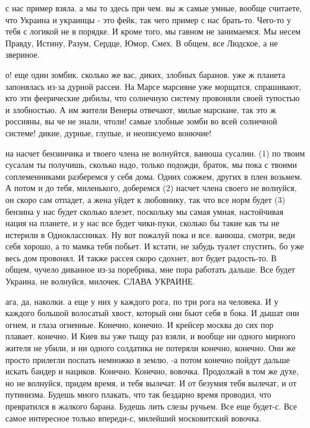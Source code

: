 с нас пример взяла. а мы то здесь при чем. вы ж самые умные, вообще считаете,
что Украина и украинцы - это фейк, так чего пример с нас брать-то. Чего-то у
тебя с логикой не в порядке. И кроме того, мы гавном не занимаемся. Мы несем
Правду, Истину, Разум, Сердце, Юмор, Смех. В общем, все Людское, а не звериное.

о! еще один зомбик. сколько же вас, диких, злобных баранов. уже ж планета
запонялась из-за дурной рассеи. На Марсе марсияне уже морщатся, спрашивают, кто
эти феерические дибилы, что солнечную систему провоняли своей тупостью и
злобностью. А им жители Венеры отвечают, милые марсиане, так это ж россияны, вы
че не знали, чтоли! самые злобные зомби во всей солнечной системе! дикие,
дурные, глупые, и неописуемо вонючие!

на насчет бензинчика и твоего члена не волнуйтся, ванюша сусалин. (1) по твоим
сусалам ты получишь, сколько надо, только подожди, браток, мы пока с твоими
соплеменниками разберемся у себя дома. Одних сожжем, других в плен возьмем. А
потом и до тебя, миленького, доберемся (2) насчет члена своего не волнуйся, он
скоро сам отпадет, а жена уйдет к любовнику, так что все норм будет (3) бензина
у нас будет сколько влезет, поскольку мы самая умная, настойчивая нация на
планете, и у нас все будет чики-пуки, сколько бы такие как ты не истерили в
Одноклассниках. Ну вот пожалуй пока и все. ванюша, смотри, веди себя хорошо, а
то мамка тебя побьет. И кстати, не забудь туалет спустить, бо уже весь дом
провонял. И также рассея скоро сдохнет, вот будет радость-то. В общем, чучело
диванное из-за поребрика, мне пора работать дальше. Все будет Украина, не
волнуйся, милочек. СЛАВА УКРАИНЕ.

ага, да, наколки. а еще у них у каждого рога, по три рога на человека. И у
каждого большой волосатый хвост, который они бьют себя в бока. И дышат они
огнем, и глаза огненные. Конечно, конечно. И крейсер москва до сих пор плавает.
конечно. И Киев вы уже тыщу раз взяли, и вообще ни одного мирного жителя не
убили, и ни одного солдатика не потеряли конечно, конечно. Они же просто
прилегли поспать немножко в землю, -а потом конечно пойдут дальше искать бандер
и нациков. Конечно. Конечно, вовочка. Продолжай в том же духе, но не волнуйся,
придем время, и тебя вылечат. И от безумия тебя вылечат, и от путинизма. Будешь
много плакать, что так бездарно время проводил, что превратился в жалкого
барана. Будешь лить слезы ручьем. Все еще будет-с. Все самое интересное только
впереди-с, милейший московитский вовочка.

